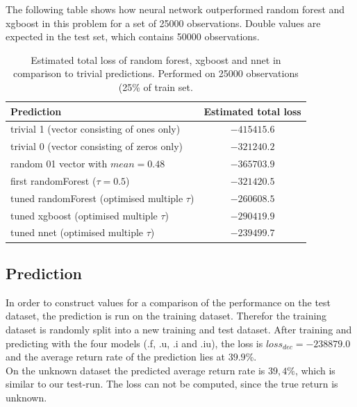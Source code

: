 \documentclass[a4paper,12pt]{article}
\begin{document}
The following table shows how neural network outperformed random forest and xgboost in this problem for a set of 25000 observations. Double values are expected in the test set, which contains 50000 observations.

\begin{table}[h]
\centering
\label{my-label}
\begin{tabular}{|lc|}
\hline
\textbf{Prediction} & \textbf{Estimated total loss} \\
\hline \hline
trivial 1 (vector consisting of ones only)                         &  $- 415415.6   $            \\
trivial 0 (vector consisting of zeros only)                       & $- 321240.2 $            \\
random 01 vector with $mean=0.48$                            &  $- 365703.9  $                \\
\hline
first randomForest ($\tau=0.5$)                                     & $- 321420.5$                \\
tuned randomForest (optimised multiple $\tau$)          &  $-260608.5$               \\
tuned xgboost (optimised multiple $\tau$)         & $-290419.9$ \\
tuned nnet (optimised multiple $\tau$)                          & $-239499.7$                   \\
\hline
\end{tabular}
\caption{Estimated total loss of random forest, xgboost and nnet in comparison to trivial predictions. Performed on 25000 observations (25\% of train set.}
\end{table}

\subsection{Prediction}
In order to construct values for a comparison of the performance on the test dataset, the prediction is run on the training dataset. Therefor the training dataset is randomly split into a new training and test dataset. After training and predicting with the four models (.f, .u, .i and .iu), the loss is $loss_{dec} = -238879.0  $ and the average return rate of the prediction lies at $39.9 \%$.\\
On the unknown dataset the predicted average return rate is $39,4 \%$, which is similar to our test-run. The loss can not be computed, since the true return is unknown.\\
\end{document}
